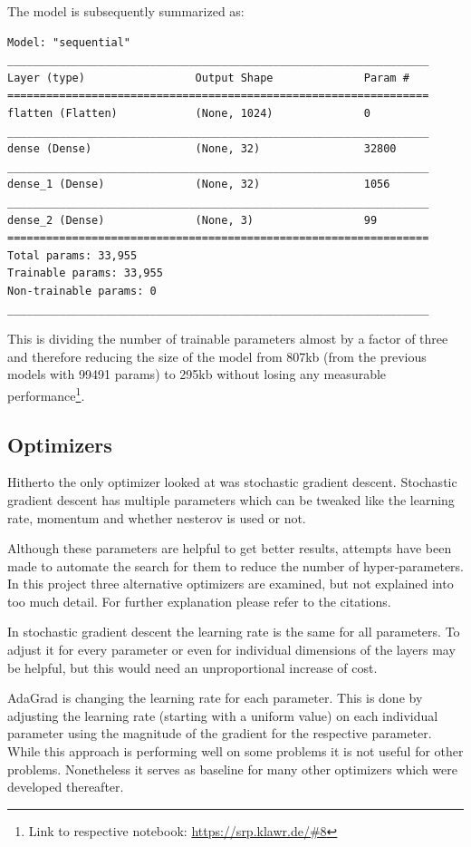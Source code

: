 The model is subsequently summarized as:
\begin{lstlisting}
Model: "sequential"
_________________________________________________________________
Layer (type)                 Output Shape              Param #   
=================================================================
flatten (Flatten)            (None, 1024)              0         
_________________________________________________________________
dense (Dense)                (None, 32)                32800     
_________________________________________________________________
dense_1 (Dense)              (None, 32)                1056      
_________________________________________________________________
dense_2 (Dense)              (None, 3)                 99        
=================================================================
Total params: 33,955
Trainable params: 33,955
Non-trainable params: 0
_________________________________________________________________
\end{lstlisting}

This is dividing the number of trainable parameters almost by a factor of three and therefore reducing the size of the model from 807kb (from the previous models with 99491 params) to 295kb without losing any measurable performance\footnote{Link to respective notebook: \url{https://srp.klawr.de/\#8}}.

\subsection{Optimizers}

Hitherto the only optimizer looked at was stochastic gradient descent.
Stochastic gradient descent has multiple parameters which can be tweaked like the learning rate, momentum and whether nesterov is used or not.

Although these parameters are helpful to get better results, attempts have been made to automate the search for them to reduce the number of hyper-parameters.
In this project three alternative optimizers are examined, but not explained into too much detail.
For further explanation please refer to the citations.

In stochastic gradient descent the learning rate is the same for all parameters.
To adjust it for every parameter or even for individual dimensions of the layers may be helpful, but this would need an unproportional increase of cost.

AdaGrad \cite{Duchi2010} is changing the learning rate for each parameter.
This is done by adjusting the learning rate (starting with a uniform value) on each individual parameter using the magnitude of the gradient for the respective parameter.
While this approach is performing well on some problems it is not useful for other problems.
Nonetheless it serves as baseline for many other optimizers which were developed thereafter.


